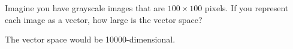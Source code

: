 Imagine you have grayscale images that are $100 \times 100$ pixels. If you represent each image as a vector, how large is the vector space?

\begin{solution}
    The vector space would be 10000-dimensional.
\end{solution}